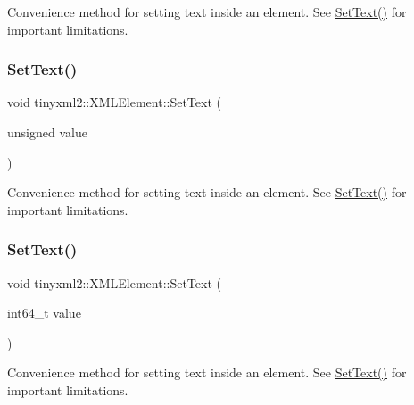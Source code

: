 Convenience method for setting text inside an element. See \mbox{\hyperlink{classtinyxml2_1_1_x_m_l_element_a1f9c2cd61b72af5ae708d37b7ad283ce}{Set\+Text()}} for important limitations. 

\mbox{\label{classtinyxml2_1_1_x_m_l_element_a7bbfcc11d516598bc924a8fba4d08597}} 
\subsubsection{\texorpdfstring{Set\+Text()}{SetText()}\hspace{0.1cm}{\footnotesize\ttfamily [3/7]}}
{\footnotesize\ttfamily void tinyxml2\+::\+X\+M\+L\+Element\+::\+Set\+Text (\begin{DoxyParamCaption}\item[{unsigned}]{value }\end{DoxyParamCaption})}



Convenience method for setting text inside an element. See \mbox{\hyperlink{classtinyxml2_1_1_x_m_l_element_a1f9c2cd61b72af5ae708d37b7ad283ce}{Set\+Text()}} for important limitations. 

\mbox{\label{classtinyxml2_1_1_x_m_l_element_a7b62cd33acdfeff7ea2b1b330d4368e4}} 
\subsubsection{\texorpdfstring{Set\+Text()}{SetText()}\hspace{0.1cm}{\footnotesize\ttfamily [4/7]}}
{\footnotesize\ttfamily void tinyxml2\+::\+X\+M\+L\+Element\+::\+Set\+Text (\begin{DoxyParamCaption}\item[{int64\+\_\+t}]{value }\end{DoxyParamCaption})}



Convenience method for setting text inside an element. See \mbox{\hyperlink{classtinyxml2_1_1_x_m_l_element_a1f9c2cd61b72af5ae708d37b7ad283ce}{Set\+Text()}} for important limitations. 

